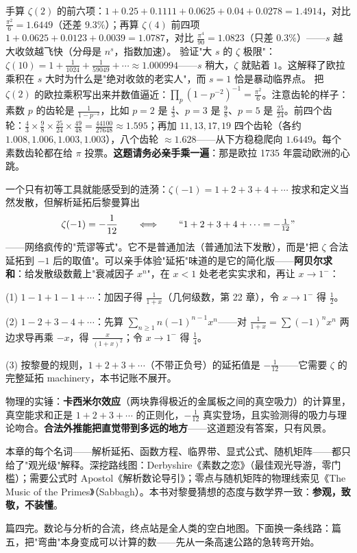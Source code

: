 \begin{dongshou}
\begin{itemize}
  \yisi 手算 $\zeta(2)$ 的前六项：$1 + 0.25 + 0.1111 + 0.0625 + 0.04 + 0.0278 = 1.4914$，对比 $\tfrac{\pi^2}{6} = 1.6449$（还差 $9.3\%$）；再算 $\zeta(4)$ 前四项 $1 + 0.0625 + 0.0123 + 0.0039 = 1.0787$，对比 $\tfrac{\pi^4}{90} = 1.0823$（只差 $0.3\%$）——$s$ 越大收敛越飞快（分母是 $n^s$，指数加速）。
  \yier 验证"大 $s$ 的 $\zeta$ 极限"：$\zeta(10) = 1 + \tfrac1{1024} + \tfrac1{59049} + \cdots \approx 1.000994$——$s$ 稍大，$\zeta$ 就贴着 $1$。这解释了欧拉乘积在 $s$ 大时为什么是"绝对收敛的老实人"，而 $s = 1$ 恰是暴动临界点。
  \yier 把 $\zeta(2)$ 的欧拉乘积写出来并数值逼近：$\prod_p (1-p^{-2})^{-1} = \tfrac{\pi^2}6$。注意齿轮的样子：素数 $p$ 的齿轮是 $\tfrac{1}{1-p^{-2}}$，比如 $p=2$ 是 $\tfrac43$、$p=3$ 是 $\tfrac98$、$p=5$ 是 $\tfrac{25}{24}$。前四个齿轮：$\tfrac43\times\tfrac98\times\tfrac{25}{24}\times\tfrac{49}{48} = \tfrac{44100}{27648} \approx 1.595$；再加 $11, 13, 17, 19$ 四个齿轮（各约 $1.008, 1.006, 1.003, 1.003$），八个齿轮 $\approx 1.628$——从下方稳稳爬向 $1.6449$。每个素数齿轮都在给 $\pi$ 投票。\textbf{这题请务必亲手乘一遍}：那是欧拉 1735 年震动欧洲的心跳。
\end{itemize}
\end{dongshou}

\begin{shaonao}
一个只有初等工具就能感受到的涟漪：$\zeta(-1) = 1 + 2 + 3 + 4 + \cdots$ 按求和定义当然发散，但解析延拓后黎曼算出
\[
\zeta(-1) = -\frac{1}{12} \qquad\Longleftrightarrow\qquad ``1+2+3+4+\cdots = -\tfrac1{12}"
\]
——网络疯传的"荒谬等式"。它不是普通加法（普通加法下发散），而是"把 $\zeta$ 合法延拓到 $-1$ 后的取值"。可以亲手体验"延拓"味道的是它的简化版——\textbf{阿贝尔求和}：给发散级数戴上"衰减因子 $x^n$"，在 $x<1$ 处老老实实求和，再让 $x\to1^-$：

(1) $1 - 1 + 1 - 1 + \cdots$：加因子得 $\tfrac1{1+x}$（几何级数，第 22 章），令 $x\to1^-$ 得 $\tfrac12$。

(2) $1 - 2 + 3 - 4 + \cdots$：先算 $\sum_{n\ge1} n(-1)^{n-1}x^n$——对 $\tfrac{1}{1+x} = \sum(-1)^n x^n$ 两边求导再乘 $-x$，得 $\tfrac{x}{(1+x)^2}$；令 $x\to1^-$ 得 $\tfrac14$。

(3) 按黎曼的规则，$1+2+3+\cdots$（不带正负号）的延拓值是 $-\tfrac1{12}$——它需要 $\zeta$ 的完整延拓 machinery，本书记账不展开。

物理的实锤：\textbf{卡西米尔效应}（两块靠得极近的金属板之间的真空吸力）的计算里，真空能求和正是 $1+2+3+\cdots$ 的正则化，$-\tfrac1{12}$ 真实登场，且实验测得的吸力与理论吻合。\textbf{合法外推能把直觉带到多远的地方}——这道题没有答案，只有风景。
\end{shaonao}

\begin{chengshi}
本章的每个名词——解析延拓、函数方程、临界带、显式公式、随机矩阵——都只给了"观光级"解释。深挖路线图：Derbyshire《素数之恋》（最佳观光导游，零门槛）；需要公式时 Apostol《解析数论导引》；零点与随机矩阵的物理线索见《The Music of the Primes》（Sabbagh）。本书对黎曼猜想的态度与数学界一致：\textbf{参观，致敬，不装懂}。
\end{chengshi}

篇四完。数论与分析的合流，终点站是全人类的空白地图。下面换一条线路：篇五，把"弯曲"本身变成可以计算的数——先从一条高速公路的急转弯开始。
